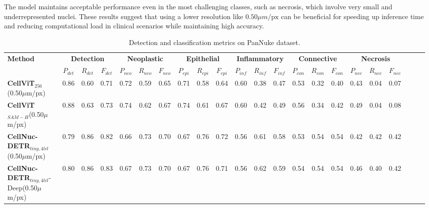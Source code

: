 The model maintains acceptable performance even in the most challenging classes, such as necrosis, which involve very small and underrepresented nuclei. These results suggest that using a lower resolution like $0.50 \mu m/\text{px}$ can be beneficial for speeding up inference time and reducing computational load in clinical scenarios while maintaining high accuracy.

\begin{table}[ht]
\vskip -0.1in
\centering
\caption{Detection and classification metrics on PanNuke dataset.}
\label{tab:pannuke05}
\vskip 0.1in
\begin{adjustbox}{width=\textwidth}
\begin{tabular}{l|ccc|ccc|ccc|ccc|ccc|cccccc}
\toprule
\multirow{2}{*}{\textbf{Method}} & \multicolumn{3}{c|}{\textbf{Detection}} & \multicolumn{3}{c|}{\textbf{Neoplastic}} & \multicolumn{3}{c|}{\textbf{Epithelial}} & \multicolumn{3}{c|}{\textbf{Inflammatory}} & \multicolumn{3}{c|}{\textbf{Connective}} & \multicolumn{3}{c}{\textbf{Necrosis}} \\
& $P_{det}$ & $R_{det}$ & $F_{det}$ & $P_{neo}$ & $R_{neo}$ & $F_{neo}$ & $P_{epi}$ & $R_{epi}$ & $F_{epi}$ & $P_{inf}$ & $R_{inf}$ & $F_{inf}$ & $P_{con}$ & $R_{con}$ & $F_{con}$ & $P_{nec}$ & $R_{nec}$ & $F_{nec}$ \\
\midrule

\textbf{CellViT$_{256}$}(0.50$\mu$m/px) \cite{hörst2023cellvit} & 0.86 & 0.60 & 0.71 & 0.72 & 0.59 & 0.65 & 0.71 & 0.58 & 0.64 & 0.60 & 0.38 & 0.47 & 0.53 & 0.32 & 0.40 & 0.43 & 0.04 & 0.07 \\
\textbf{CellViT$_{SAM-H}$}(0.50$\mu$m/px) \cite{hörst2023cellvit} & 0.88 & 0.63 & 0.73 & 0.74 & 0.62 & 0.67 & 0.74 & 0.61 & 0.67 & 0.60 & 0.42 & 0.49 & 0.56 & 0.34 & 0.42 & 0.49 & 0.04 & 0.08 \\

\midrule

\textbf{CellNuc-DETR}$_{tiny,4lvl}$(0.50$\mu$m/px)&0.79&0.86&0.82&0.66&0.73&0.70&0.67&0.76&0.72&0.56&0.61&0.58&0.53&0.54&0.54&0.42&0.42&0.42\\
\textbf{CellNuc-DETR}$_{tiny,4lvl}$-Deep(0.50$\mu$m/px)&0.80&0.86&0.83&0.67&0.73&0.70&0.67&0.76&0.71&0.56&0.62&0.59&0.54&0.54&0.54&0.46&0.40&0.42\\




\end{tabular}
\end{adjustbox}
\end{table}
